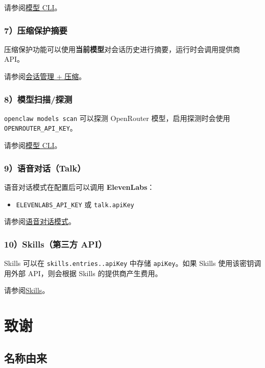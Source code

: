 请参阅\href{/cli/models}{模型 CLI}。

\subsubsection{7）压缩保护摘要}


压缩保护功能可以使用\textbf{当前模型}对会话历史进行摘要，运行时会调用提供商 API。

请参阅\href{/reference/session-management-compaction}{会话管理 + 压缩}。

\subsubsection{8）模型扫描/探测}


\texttt{openclaw models scan} 可以探测 OpenRouter 模型，启用探测时会使用 \texttt{OPENROUTER\_API\_KEY}。

请参阅\href{/cli/models}{模型 CLI}。

\subsubsection{9）语音对话（Talk）}


语音对话模式在配置后可以调用 \textbf{ElevenLabs}：

\begin{itemize}
  \item \texttt{ELEVENLABS\_API\_KEY} 或 \texttt{talk.apiKey}
\end{itemize}


请参阅\href{/nodes/talk}{语音对话模式}。

\subsubsection{10）Skills（第三方 API）}


Skills 可以在 \texttt{skills.entries..apiKey} 中存储 \texttt{apiKey}。如果 Skills 使用该密钥调用外部 API，则会根据 Skills 的提供商产生费用。

请参阅\href{/tools/skills}{Skills}。


\clearpage

\section{致谢}

\subsection{名称由来}


